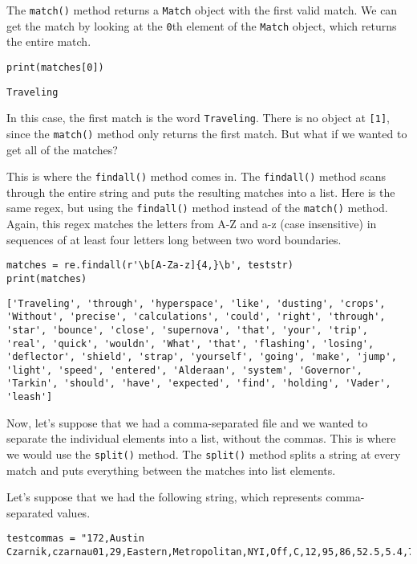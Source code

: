 The \verb|match()| method returns a \verb|Match| object with the first valid match. We can get the match by looking at the \verb|0|th element of the \verb|Match| object, which returns the entire match.
\begin{lstlisting}[style=pippython]
print(matches[0])
\end{lstlisting}
\begin{lstlisting}[style=none]
Traveling
\end{lstlisting}
In this case, the first match is the word \verb|Traveling|. There is no object at \verb|[1]|, since the \verb|match()| method only returns the first match. But what if we wanted to get all of the matches?\par
This is where the \verb|findall()| method comes in. The \verb|findall()| method scans through the entire string and puts the resulting matches into a list. Here is the same regex, but using the \verb|findall()| method instead of the \verb|match()| method. Again, this regex matches the letters from A-Z and a-z (case insensitive) in sequences of at least four letters long between two word boundaries.
\begin{lstlisting}[style=pippython]
matches = re.findall(r'\b[A-Za-z]{4,}\b', teststr)
print(matches)
\end{lstlisting}
\begin{lstlisting}[style=none]
['Traveling', 'through', 'hyperspace', 'like', 'dusting', 'crops', 'Without', 'precise', 'calculations', 'could', 'right', 'through', 'star', 'bounce', 'close', 'supernova', 'that', 'your', 'trip', 'real', 'quick', 'wouldn', 'What', 'that', 'flashing', 'losing', 'deflector', 'shield', 'strap', 'yourself', 'going', 'make', 'jump', 'light', 'speed', 'entered', 'Alderaan', 'system', 'Governor', 'Tarkin', 'should', 'have', 'expected', 'find', 'holding', 'Vader', 'leash']
\end{lstlisting}
Now, let's suppose that we had a comma-separated file and we wanted to separate the individual elements into a list, without the commas. This is where we would use the \verb|split()| method. The \verb|split()| method splits a string at every match and puts everything between the matches into list elements.\par
Let's suppose that we had the following string, which represents comma-separated values.
\begin{lstlisting}[style=pippython]
testcommas = "172,Austin Czarnik,czarnau01,29,Eastern,Metropolitan,NYI,Off,C,12,95,86,52.5,5.4,72,61,54.1,7.1,16.9,91.8,108.8,51.7,48.3,11:02,10:22,4,4,-0.1,16,62.5,0:41,10:23,3.5,4.2,1.6,0:27,7.7,14,0,0:11,-11,0,23.7,2,4,6,6,0,0.9,2,0,0,0,4,0,0,10,20,132,11:02,5,2,23,35,39.7"
\end{lstlisting}

